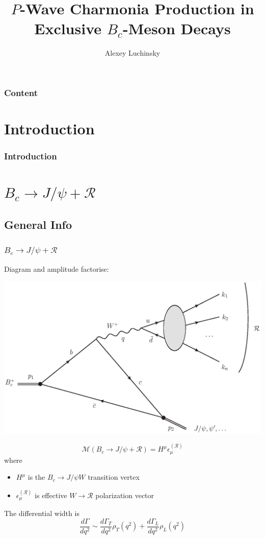 \documentclass{beamer}
\title{$P$-Wave Charmonia Production in Exclusive $B_c$-Meson Decays}
\author{Alexey Luchinsky}
\newcommand{\R}{\mathcal{R}}
\newcommand{\M}{\mathcal{M}}
\begin{document}
\begin{frame}
  \maketitle
\end{frame}

\begin{frame}
  \frametitle{Content}
  \tableofcontents
\end{frame}

\section{Introduction}
\begin{frame}
  \frametitle{Introduction}
\end{frame}

\section{$B_c\to J/\psi + \R$}

\subsection{General Info}

\begin{frame}[t]
  \frametitle{$B_c\to J/\psi+\R$}
  Diagram and amplitude factorise:
  \begin{center}
    \includegraphics[width=0.5\columnwidth]{diags_BcCCW}
  \end{center}
      $$\M\left(B_c \to J/\psi + \R\right) = H^\mu \epsilon^{(\R)}_\mu$$
   where
   \begin{itemize}
   \item $H^\mu$ is the $B_c\to J/\psi W$ transition vertex
   \item $\epsilon^{(\R)}_\mu$ is effective  $W\to\R$ polarization vector
   \end{itemize}
The differential width is
$$
\frac{d\Gamma}{dq^2} \sim \frac{d\Gamma_T}{dq^2} \rho_T\left(q^2\right) + \frac{d\Gamma_L}{dq^2} \rho_L\left(q^2\right)
$$
\end{frame}
\end{document}
